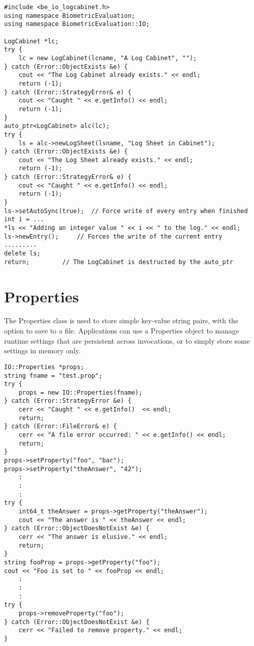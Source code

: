 \begin{lstlisting}[caption={Using a LogSheet within a LogCabinet}, label=logcabinetuse]
#include <be_io_logcabinet.h>
using namespace BiometricEvaluation;
using namespace BiometricEvaluation::IO;

LogCabinet *lc;
try {
    lc = new LogCabinet(lcname, "A Log Cabinet", "");
} catch (Error::ObjectExists &e) {
    cout << "The Log Cabinet already exists." << endl;
    return (-1);
} catch (Error::StrategyError& e) {
    cout << "Caught " << e.getInfo() << endl;
    return (-1);
}
auto_ptr<LogCabinet> alc(lc);
try {
    ls = alc->newLogSheet(lsname, "Log Sheet in Cabinet");
} catch (Error::ObjectExists &e) {
    cout << "The Log Sheet already exists." << endl;
    return (-1);
} catch (Error::StrategyError& e) {
    cout << "Caught " << e.getInfo() << endl;
    return (-1);
}
ls->setAutoSync(true);	// Force write of every entry when finished
int i = ...
*ls << "Adding an integer value " << i << " to the log." << endl;
ls->newEntry();		// Forces the write of the current entry
.........
delete ls;
return;			// The LogCabinet is destructed by the auto_ptr
\end{lstlisting}

\section{Properties}
\label{sec-properties}
The Properties class is used to store simple key-value string pairs, with the
option to save to a file. Applications can use a Properties object to manage
runtime settings that are persistent across invocations, or to simply store
some settings in memory only.

\begin{lstlisting}[caption={Using a Properties Object}, label=propertiesuse]
IO::Properties *props;
string fname = "test.prop";
try {
    props = new IO::Properties(fname);
} catch (Error::StrategyError &e) {
    cerr << "Caught " << e.getInfo()  << endl;
    return;
} catch (Error::FileError& e) {
    cerr << "A file error occurred: " << e.getInfo() << endl;
    return;
}
props->setProperty("foo", "bar");
props->setProperty("theAnswer", "42");
    :
    :
    :
try {
    int64_t theAnswer = props->getProperty("theAnswer");
    cout << "The answer is " << theAnswer << endl;
} catch (Error::ObjectDoesNotExist &e) {
    cerr << "The answer is elusive." << endl;
    return;
}
string fooProp = props->getProperty("foo");
cout << "Foo is set to " << fooProp << endl;
    :
    :
    :
try {
    props->removeProperty("foo");
} catch (Error::ObjectDoesNotExist &e) {
    cerr << "Failed to remove property." << endl;
}
\end{lstlisting}

